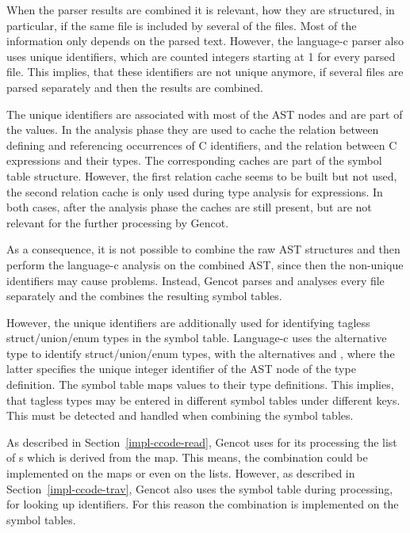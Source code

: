 When the parser results are combined it is relevant, how they are structured, in particular, if the same file
is included by several of the  files. Most of the information only depends on the parsed text.
However, the language-c parser also uses unique identifiers, which are counted integers starting at 1 for every
parsed file. This implies, that these identifiers are not unique anymore, if several files are parsed separately
and then the results are combined.

The unique identifiers are associated with most of the AST nodes and are part of the  values.
In the analysis phase they are used to cache the relation between defining and referencing occurrences of C identifiers,
and the relation between C expressions and their types. The corresponding caches are part of the symbol table structure.
However, the first relation cache seems to be built but not used, the second relation cache is only used during 
type analysis for expressions. In both cases, after the analysis phase the caches are still present, but are not 
relevant for the further processing by Gencot.

As a consequence, it is not possible to combine the raw AST structures and then perform the language-c analysis
on the combined AST, since then the non-unique identifiers may cause problems. Instead, Gencot parses and analyses
every file separately and the combines the resulting symbol tables.

However, the unique identifiers are additionally used for identifying tagless struct/union/enum types in the symbol table.
Language-c uses the alternative type  to identify struct/union/enum types, with the alternatives 
 and , where the latter specifies the unique integer identifier of the AST node
of the type definition. The symbol table maps  values to their type definitions. This implies, that
tagless types may be entered in different symbol tables under different keys. This must be detected and handled
when combining the symbol tables.

As described in Section~\ref{impl-ccode-read}, Gencot uses for its processing the list of s which is
derived from the  map. This means, the combination could be implemented on the 
maps or even on the  lists. However, as described in Section~\ref{impl-ccode-trav}, Gencot also
uses the symbol table during processing, for looking up identifiers. For this reason the combination is implemented
on the symbol tables.

